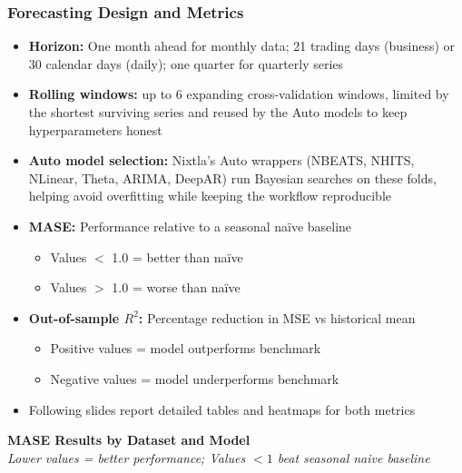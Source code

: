\documentclass[ignorenonframetext, 9pt]{beamer}
\begin{document}
\begin{frame}
  \frametitle{Forecasting Design and Metrics}
  \begin{itemize}
  \item \textbf{Horizon:} \alert{One month ahead} for monthly data; \alert{21 trading days} (business) or \alert{30 calendar days} (daily); \alert{one quarter} for quarterly series
  \item \textbf{Rolling windows:} up to \alert{6 expanding cross-validation windows}, limited by the shortest surviving series and reused by the Auto models to keep hyperparameters honest
  \item \textbf{Auto model selection:} Nixtla's \alert{Auto wrappers} (NBEATS, NHITS, NLinear, Theta, ARIMA, DeepAR) run Bayesian searches on these folds, helping avoid overfitting while keeping the workflow reproducible
  \item \textbf{MASE:} Performance relative to a seasonal naïve baseline
    \begin{itemize}
      \item Values $<$ 1.0 = better than naïve
      \item Values $>$ 1.0 = worse than naïve
    \end{itemize}
  \item \textbf{Out-of-sample $R^2$:} Percentage reduction in MSE vs historical mean
    \begin{itemize}
      \item Positive values = model outperforms benchmark
      \item Negative values = model underperforms benchmark
    \end{itemize}
  \item Following slides report detailed tables and heatmaps for both metrics
  \end{itemize}
\end{frame}
  
\begin{frame}[plain]
    \tiny
    \vspace{-0.2cm}
    \centering
    \textbf{MASE Results by Dataset and Model}\\
    {\scriptsize \textit{Lower values = better performance; Values $<1$ beat seasonal naive baseline}}\\
    \vspace{0.2cm}
    \resizebox{0.98\textwidth}{!}{}
  \end{frame}
  
\end{document}
